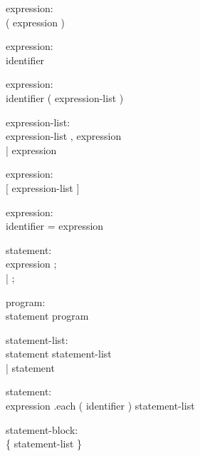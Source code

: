 \begin{description}
  \item[]expression: \hfill \\
    ( expression )
\end{description}

\begin{description}
  \item[]expression: \hfill \\
    identifier
\end{description}

\begin{description}
  \item[]expression: \hfill \\
    identifier ( expression-list )
\end{description}

\begin{description}
  \item[]expression-list: \hfill \\
    expression-list , expression \\
    | expression
\end{description}

\begin{description}
  \item[]expression: \hfill \\
    $[$ expression-list $]$
\end{description}

\begin{description}
  \item[]expression: \hfill \\
    identifier = expression
\end{description}

\begin{description}
  \item[]statement: \hfill \\
    expression ; \\
    | ;
\end{description}

\begin{description}
  \item[]program: \hfill \\
    statement program
\end{description}

\begin{description}
  \item[]statement-list: \hfill \\
    statement statement-list \\
    | statement
\end{description}

\begin{description}
  \item[]statement: \hfill \\
    expression .each ( identifier ) { statement-list }
\end{description}

\begin{description}
  \item[]statement-block: \hfill \\
    \{ statement-list \}
\end{description}
